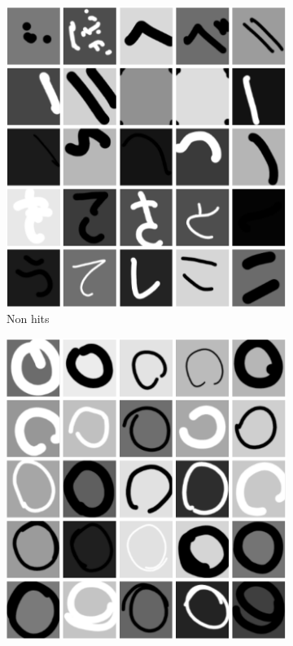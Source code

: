 \begin{figure} \label{fig:generated_data_samples}
    \centering
    \begin{subfigure}[b]{0.3\textwidth}
        \includegraphics[width=\textwidth]{images/25_n.png}
        \caption{Non hits}
        \label{fig:25_non_hits}
    \end{subfigure}
    \begin{subfigure}[b]{0.3\textwidth}
        \includegraphics[width=\textwidth]{images/25_o.png}

\end{subfigure}
\end{figure}
